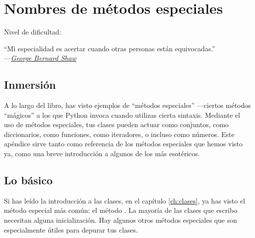 
\chapter{Nombres de métodos especiales}

\noindent Nivel de dificultad:\diflllll

\begin{citaCap}
    ``Mi especialidad es acertar cuando otras personas están equivocadas.'' \\
        ---\emph{\href{https://en.wikiquote.org/wiki/George\_Bernard\_Shaw}{George Bernard Shaw}}
\end{citaCap}

\section{Inmersión}

A lo largo del libro, has visto ejemplos de ``métodos especiales'' ---ciertos métodos ``mágicos'' a los que Python invoca cuando utilizas cierta sintaxis. Mediante el uso de métodos especiales, tus clases pueden actuar como conjuntos, como diccionarios, como funciones, como iteradores, o incluso como números. Este apéndice sirve tanto como referencia de los métodos especiales que hemos visto ya, como una breve introducción a algunos de los más esotéricos.

\section{Lo básico}

Si has leído la introducción a las clases, en el capítulo \ref{ch:clases}, ya has visto el método especial más común: el método . La mayoría de las clases que escribo necesitan alguna inicialización. Hay algunos otros métodos especiales que son especialmente útiles para depurar tus clases.

